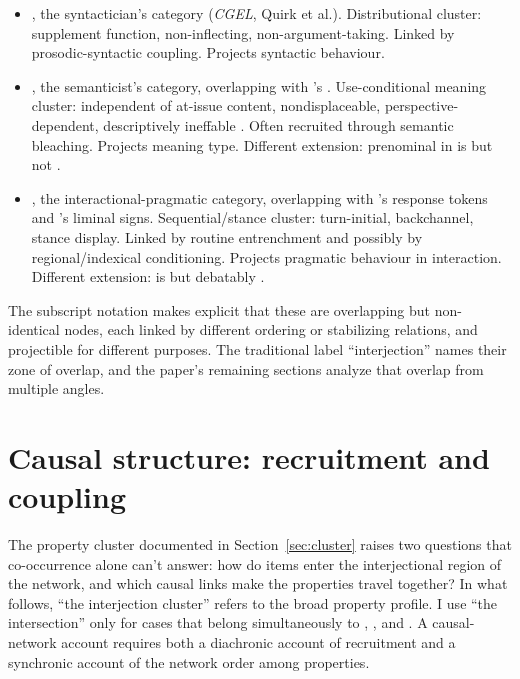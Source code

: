 \documentclass[12pt]{article}
\begin{document}
\begin{itemize}
\item {}, the syntactician's
  category (\textit{CGEL}, Quirk et al.). Distributional cluster: supplement
  function, non-inflecting, non-argument-taking. Linked by
  prosodic-syntactic coupling. Projects syntactic behaviour.
\item {}, the semanticist's
  category, overlapping with \textcite{potts2007}'s .
  Use-conditional meaning cluster: independent of at-issue content,
  nondisplaceable, perspective-dependent, descriptively ineffable
  \citep[166]{potts2007}. Often recruited through semantic bleaching.
  Projects meaning type. Different extension: prenominal  in
   is  but not
  .
\item {}, the interactional-pragmatic
  category, overlapping with \textcite{stivers2019}'s
  response tokens and \textcite{dingemanse2020}'s liminal signs.
  Sequential/stance cluster: turn-initial, backchannel, stance display.
  Linked by routine entrenchment and possibly by regional/indexical
  conditioning. Projects pragmatic behaviour in interaction. Different
  extension:  is
   but debatably
  .
\end{itemize}

The subscript notation makes explicit that these are overlapping but
non-identical nodes, each linked by different ordering or stabilizing
relations, and projectible for different purposes. The traditional label
\enquote{interjection} names their zone of overlap, and the paper's
remaining sections analyze that overlap from multiple angles.

\section[Causal structure]{Causal structure: recruitment and coupling}\label{sec:causal-structure}

The property cluster documented in Section~\ref{sec:cluster} raises two
questions that co-occurrence alone can't answer: how do items enter the
interjectional region of the network, and which causal links make the
properties travel together? In what follows, \enquote{the
interjection cluster} refers to the broad property profile. I use
\enquote{the intersection} only for cases that belong simultaneously to
, , and
.
A causal-network account requires both a diachronic account of
recruitment and a synchronic account of the network order among
properties.
\end{document}
